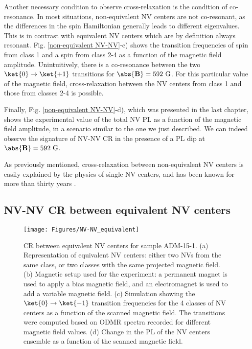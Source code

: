\documentclass[a4paper,11pt]{report}
\begin{document}
Another necessary condition to observe cross-relaxation is the condition of co-resonance. In most situations, non-equivalent NV centers are not co-resonant, as the differences in the spin Hamiltonian generally leads to different eigenvalues. This is in contrast with equivalent NV centers which are by definition always resonant. Fig. \ref{non-equivalent NV-NV}-c) shows the transition frequencies of spin from class 1 and a spin from class 2-4 as a function of the magnetic field amplitude. Unintuitively, there is a co-resonance between the two $\ket{0} \to \ket{+1}$ transitions for $\abs{\mathbf{B}}=592\ \rm G$. For this particular value of the magnetic field, cross-relaxation between the NV centers from class 1 and those from classes 2-4 is possible.

Finally, Fig. \ref{non-equivalent NV-NV}-d), which was presented in the last chapter, shows the experimental value of the total NV PL as a function of the magnetic field amplitude, in a scenario similar to the one we just described. We can indeed observe the signature of NV-NV CR in the presence of a PL dip at $\abs{\mathbf{B}}=592\ \rm G$.

As previously mentioned, cross-relaxation between non-equivalent NV centers is easily explained by the physics of single NV centers, and has been known for more than thirty years \citep{holliday1989optical, van1989cross}.

\subsection{NV-NV CR between equivalent NV centers}

\begin{figure}[h]
\centering
\texttt{[image: Figures/NV-NV\_equivalent]}
\caption{CR between equivalent NV centers for sample ADM-15-1. (a) Representation of equivalent NV centers: either two NVs from the same class, or two classes with the same projected magnetic field. (b) Magnetic setup used for the experiment: a permanent magnet is used to apply a bias magnetic field, and an electromagnet is used to add a variable magnetic field. (c) Simulation showing the $\ket{0}\to\ket{-1}$ transition frequencies for the 4 classes of NV centers as a function of the scanned magnetic field. The transitions were computed based on ODMR spectra recorded for different magnetic field values. (d) Change in the PL of the NV centers ensemble as a function of the scanned magnetic field.}
\label{equivalent NV-NV}
\end{figure}
\end{document}
